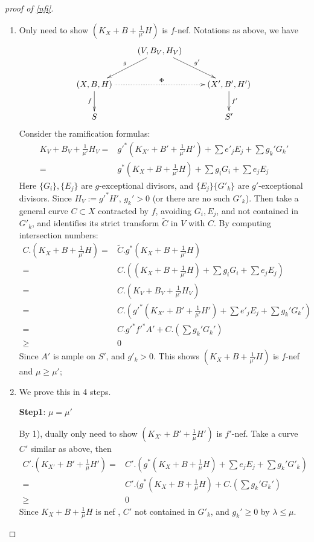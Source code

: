 \documentclass{article}
\begin{document}
\begin{proof}[proof of \ref{nfi}]
  \begin{enumerate}
    \item Only need to show $ (K_X+B+\frac{1}{\mu'}H) $ is $ f $-nef. Notations as above, we have
      \[ \xymatrix{
      &(V,B_V,H_V)\ar[dl]_g\ar[dr]^{g'}&\\
          (X,B,H)\ar[d]_f\ar@{.>}[rr]^\Phi&&(X',B',H')\ar[d]^{f'}\\
      S&&S'} \]
      Consider the ramification formulas:
      \[
        \begin{aligned}  
          K_V+B_V+\frac{1}{\mu'}H_V=&g'^*(K_{X'}+B'+\frac{1}{\mu'}H')+\sum e'_jE_j+ \sum g_k'G_k'\\
          =&g^*(K_{X}+B+\frac{1}{\mu'}H)+\sum g_iG_i+\sum e_jE_j
        \end{aligned}
      \]
      Here $ \{G_i\}, \{E_j\} $ are $ g $-exceptional divisors, and $ \{E_j\}\{G'_k\} $ are $ g' $-exceptional divisors. Since $H_V:=g'^*H' $, $ g_k'>0 $ (or there are no such $ G'_k $). Then take a general curve $ C\subset X $ contracted by $ f $,  avoiding $ G_i, E_j $, and not contained in $ G'_k $, and identifies its strict transform $ \tilde{C} $ in $ V $ with $ C $. By computing intersection numbers:
      \[
        \begin{aligned}
          C.(K_X+B+\frac{1}{\mu'}H)=&\tilde{C}.g^*(K_X+B+\frac{1}{\mu'}H)
          \\=&C.((K_X+B+\frac{1}{\mu'}H)+\sum g_iG_i+\sum e_jE_j)\\
          =&C.(K_V+B_V+\frac{1}{\mu'}H_V)\\
          =&C.(g'^*(K_{X'}+B'+\frac{1}{\mu'}H')+\sum e'_jE_j+ \sum g_k'G_k')\\
          =&C.g'^*f'^*A'+C.(\sum g_k'G_k')\\
          \geqslant&0
        \end{aligned}
      \]
      Since $ A' $ is ample on $ S' $, and $ g'_k>0 $. This shows $ (K_X+B+\frac{1}{\mu'}H) $ is $ f $-nef and $ \mu\geqslant \mu' $;
    \item We prove this in 4 steps.

      \textbf{Step1}: $ \mu=\mu' $

      By 1), dually only need to show $ (K_{X'}+B'+\frac{1}{\mu}H') $ is $ f' $-nef. Take a curve $ C' $ similar as above, then
      \[
        \begin{aligned}
          C'.(K_{X'}+B'+\frac{1}{\mu}H')=&C'.(g^*(K_{X}+B+\frac{1}{\mu}H)+\sum e_jE_j+ \sum g_k'G'_k)\\
          =&C'.(g^*(K_{X}+B+\frac{1}{\mu}H)+C.(\sum g_k'G_k')\\
          \geqslant&0
        \end{aligned}
      \]
      Since $ K_{X}+B+\frac{1}{\mu}H $ is nef , $ C' $ not contained in $ G'_k $, and $ g_k'\geqslant 0 $ by $ \lambda\leqslant \mu. $


\end{enumerate}
\end{proof}
\end{document}
